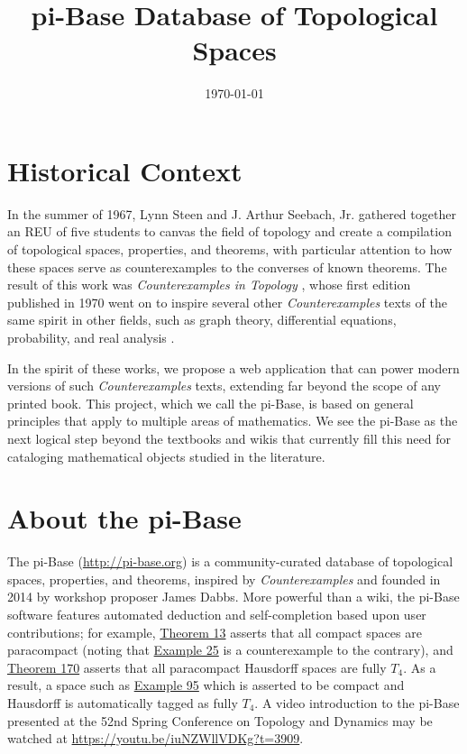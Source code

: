 \documentclass{amsart}
\title{pi-Base Database of Topological Spaces}
\date{\today}
\begin{document}
\maketitle


\section{Historical Context}

In the summer of 1967, Lynn Steen and J. Arthur Seebach, Jr. gathered together
an REU of five students to canvas the field of topology and create
a compilation of topological spaces, properties, and theorems, with particular
attention to how these spaces serve as counterexamples to the converses of
known theorems.
The result of this work was \textit{Counterexamples in Topology} 
\cite{MR1382863}, whose first edition published in 1970 
went on to inspire several other \textit{Counterexamples}
texts of the same spirit in other fields, such as graph theory, differential
equations, probability, and real analysis
\cite{MR0491272,MR1113487,MR930671,MR1256489}.

In the spirit of these works,
we propose a web application that can power modern versions
of such \textit{Counterexamples} texts, extending far beyond the scope
of any printed book. This project, which we call the pi-Base, is based 
on general principles that apply to multiple areas of mathematics.
We see the pi-Base as the next logical step beyond the textbooks
and wikis that currently fill this need for cataloging mathematical
objects studied in the literature.

\section{About the pi-Base}

The pi-Base (\url{http://pi-base.org}) is a community-curated
database of topological spaces, properties, and theorems, 
inspired by \textit{Counterexamples} and founded in 2014 by
workshop proposer James Dabbs. More
powerful than a wiki, the pi-Base software features automated
deduction and self-completion based upon user contributions;
for example,
\href{https://topology.pi-base.org/theorems/I000013}{Theorem 13}
asserts that all compact spaces are paracompact (noting
that \href{https://topology.pi-base.org/spaces/S000025}{Example 25}
is a counterexample to the contrary), and
\href{https://topology.pi-base.org/theorems/I000170}{Theorem 170}
asserts that all paracompact Hausdorff spaces are fully \(T_4\).
As a result, a space such as
\href{https://topology.pi-base.org/spaces/S000095}{Example 95}
which is asserted to be compact and Hausdorff is automatically tagged
as fully \(T_4\). A video introduction to the pi-Base presented at the
52nd Spring Conference on Topology and Dynamics may be
watched at \url{https://youtu.be/iuNZWllVDKg?t=3909}.
\end{document}
